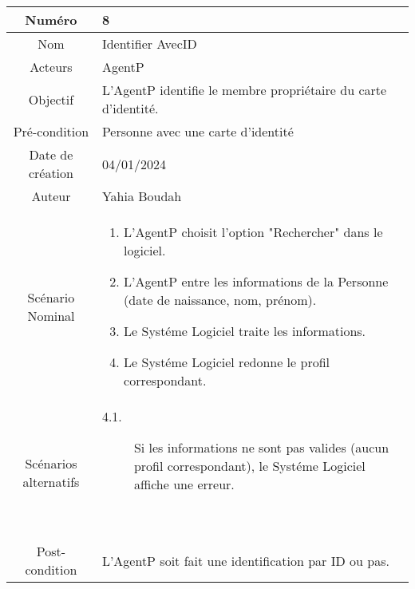

\begin{tabular}{ |c|p{12cm}| }
    \hline
    Numéro & 8 \\
    \hline
    Nom & Identifier AvecID \\
    \hline
    Acteurs & AgentP \\ 
    \hline
    Objectif & L'AgentP identifie le membre propriétaire du carte d'identité. \\ 
    \hline
    Pré-condition & Personne avec une carte d'identité \\
    \hline
    Date de création & 04/01/2024 \\
    \hline
    Auteur & Yahia Boudah \\
    \hline
    Scénario Nominal & \begin{enumerate}
        \item L'AgentP choisit l'option "Rechercher" dans le logiciel.
        \item L'AgentP entre les informations de la Personne (date de naissance, nom, prénom).
        \item Le Systéme Logiciel traite les informations.
        \item Le Systéme Logiciel redonne le profil correspondant.
    \end{enumerate} \\
    \hline
    Scénarios alternatifs & \begin{description}
        \item[4.1.] Si les informations ne sont pas valides (aucun profil correspondant), le Systéme Logiciel affiche une erreur.
    \end{description} \\
    \hline
    Post-condition & L'AgentP soit fait une identification par ID ou pas. \\
    \hline
\end{tabular}